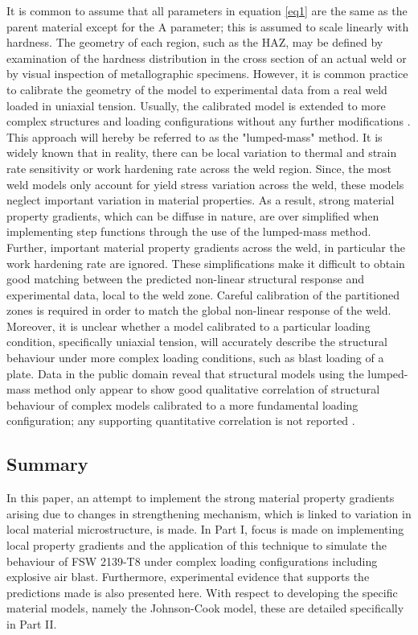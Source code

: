 It is common to assume that all parameters in equation \ref{eq1} are the same as the parent material except for the A parameter; this is assumed to scale linearly with hardness. The geometry of each region, such as the HAZ, may be defined by examination of the hardness distribution in the cross section of an actual weld or by visual inspection of metallographic specimens. However, it is common practice to calibrate the geometry of the model to experimental data from a real weld loaded in uniaxial tension. Usually, the calibrated model is extended to more complex structures and loading configurations without any further modifications \cite{McWilliams2013,Grujicic2011a}. This approach will hereby be referred to as the "lumped-mass" method. 
It is widely known that in reality, there can be local variation to thermal and strain rate sensitivity or work hardening rate across the weld region. Since, the most weld models only account for yield stress variation across the weld, these models neglect important variation in material properties.
As a result, strong material property gradients, which can be diffuse in nature, are over simplified when implementing step functions through the use of the lumped-mass method. Further, important material property gradients across the weld, in particular the work hardening rate are ignored. These simplifications make it difficult to obtain good matching between the predicted non-linear structural response and experimental data, local to the weld zone. Careful calibration of the partitioned zones is required in order to match the global non-linear response of the weld. Moreover, it is unclear whether a model calibrated to a particular loading condition, specifically uniaxial tension, will accurately describe the structural behaviour under more complex loading conditions, such as blast loading of a plate. Data in the public domain reveal that structural models using the lumped-mass method only appear to show good qualitative correlation of structural behaviour of complex models calibrated to a more fundamental loading configuration; any supporting quantitative correlation is not reported \cite{McWilliams2013,Grujicic2011a}. 

\subsection{Summary}
\label{IntroSummary}
In this paper, an attempt to implement the strong material property gradients arising due to changes in strengthening mechanism, which is linked to variation in local material microstructure, is made. In Part I, focus is made on implementing local property gradients and the application of this technique to simulate the behaviour of FSW 2139-T8 under complex loading configurations including explosive air blast. Furthermore, experimental evidence that supports the predictions made is also presented here. With respect to developing the specific material models, namely the Johnson-Cook model, these are detailed specifically in Part II. 

